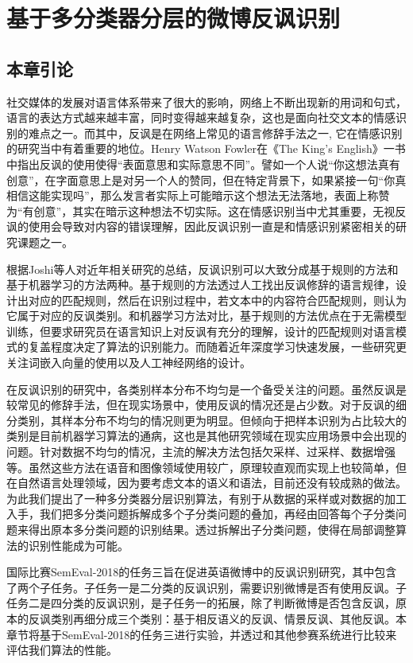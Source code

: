 \chapter{基于多分类器分层的微博反讽识别}
\label{cha:exp_irony_det}

\section{本章引论}

社交媒体的发展对语言体系带来了很大的影响，网络上不断出现新的用词和句式，语言的表达方式越来越丰富，同时变得越来越复杂，这也是面向社交文本的情感识别的难点之一。而其中，反讽是在网络上常见的语言修辞手法之一, 它在情感识别的研究当中有着重要的地位。Henry Watson Fowler在《The King's English》一书中指出反讽的使用使得“表面意思和实际意思不同”。譬如一个人说“你这想法真有创意”，在字面意思上是对另一个人的赞同，但在特定背景下，如果紧接一句“你真相信这能实现吗”，那么发言者实际上可能暗示这个想法无法落地，表面上称赞为“有创意”，其实在暗示这种想法不切实际。这在情感识别当中尤其重要，无视反讽的使用会导致对内容的错误理解，因此反讽识别一直是和情感识别紧密相关的研究课题之一。

根据Joshi等人\cite{joshi2017automatic}对近年相关研究的总结，反讽识别可以大致分成基于规则的方法和基于机器学习的方法两种。基于规则的方法透过人工找出反讽修辞的语言规律，设计出对应的匹配规则，然后在识别过程中，若文本中的内容符合匹配规则，则认为它属于对应的反讽类别。和机器学习方法对比，基于规则的方法优点在于无需模型训练，但要求研究员在语言知识上对反讽有充分的理解，设计的匹配规则对语言模式的复盖程度决定了算法的识别能力。而随着近年深度学习快速发展，一些研究更关注词嵌入向量的使用以及人工神经网络的设计。

在反讽识别的研究中，各类别样本分布不均匀是一个备受关注的问题。虽然反讽是较常见的修辞手法，但在现实场景中，使用反讽的情况还是占少数。对于反讽的细分类别，其样本分布不均匀的情况则更为明显。但倾向于把样本识别为占比较大的类别是目前机器学习算法的通病，这也是其他研究领域在现实应用场景中会出现的问题。针对数据不均匀的情况，主流的解决方法包括欠采样、过采样、数据增强等。虽然这些方法在语音和图像领域使用较广，原理较直观而实现上也较简单，但在自然语言处理领域，因为要考虑文本的语义和语法，目前还没有较成熟的做法。为此我们提出了一种多分类器分层识别算法，有别于从数据的采样或对数据的加工入手，我们把多分类问题拆解成多个子分类问题的叠加，再经由回答每个子分类问题来得出原本多分类问题的识别结果。透过拆解出子分类问题，使得在局部调整算法的识别性能成为可能。

国际比赛SemEval-2018的任务三\cite{van2018semeval}旨在促进英语微博中的反讽识别研究，其中包含了两个子任务。子任务一是二分类的反讽识别，需要识别微博是否有使用反讽。子任务二是四分类的反讽识别，是子任务一的拓展，除了判断微博是否包含反讽，原本的反讽类别再细分成三个类别：基于相反语义的反讽、情景反讽、其他反讽。本章节将基于SemEval-2018的任务三进行实验，并透过和其他参赛系统进行比较来评估我们算法的性能。


